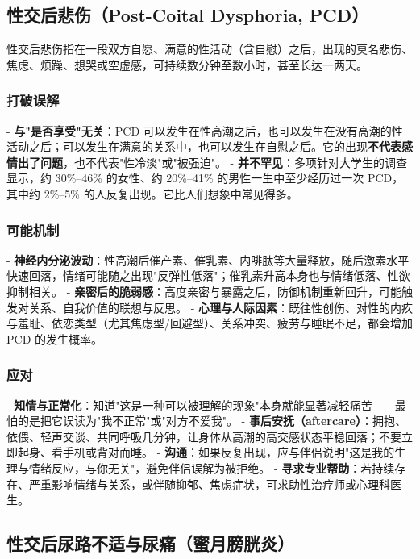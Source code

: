 \subsection{性交后悲伤（Post-Coital Dysphoria, PCD）}

性交后悲伤指在一段双方自愿、满意的性活动（含自慰）之后，出现的莫名悲伤、焦虑、烦躁、想哭或空虚感，可持续数分钟至数小时，甚至长达一两天。

\subsubsection{打破误解}

- \textbf{与"是否享受"无关}：PCD 可以发生在性高潮之后，也可以发生在没有高潮的性活动之后；可以发生在满意的关系中，也可以发生在自慰之后。它的出现\textbf{不代表感情出了问题}，也不代表"性冷淡"或"被强迫"。
- \textbf{并不罕见}：多项针对大学生的调查显示，约 30\%--46\% 的女性、约 20\%--41\% 的男性一生中至少经历过一次 PCD，其中约 2\%--5\% 的人反复出现。它比人们想象中常见得多。

\subsubsection{可能机制}

- \textbf{神经内分泌波动}：性高潮后催产素、催乳素、内啡肽等大量释放，随后激素水平快速回落，情绪可能随之出现"反弹性低落"；催乳素升高本身也与情绪低落、性欲抑制相关。
- \textbf{亲密后的脆弱感}：高度亲密与暴露之后，防御机制重新回升，可能触发对关系、自我价值的联想与反思。
- \textbf{心理与人际因素}：既往性创伤、对性的内疚与羞耻、依恋类型（尤其焦虑型/回避型）、关系冲突、疲劳与睡眠不足，都会增加 PCD 的发生概率。

\subsubsection{应对}

- \textbf{知情与正常化}：知道"这是一种可以被理解的现象"本身就能显著减轻痛苦——最怕的是把它误读为"我不正常"或"对方不爱我"。
- \textbf{事后安抚（aftercare）}：拥抱、依偎、轻声交谈、共同呼吸几分钟，让身体从高潮的高交感状态平稳回落；不要立即起身、看手机或背对而睡。
- \textbf{沟通}：如果反复出现，应与伴侣说明"这是我的生理与情绪反应，与你无关"，避免伴侣误解为被拒绝。
- \textbf{寻求专业帮助}：若持续存在、严重影响情绪与关系，或伴随抑郁、焦虑症状，可求助性治疗师或心理科医生。

\subsection{性交后尿路不适与尿痛（蜜月膀胱炎）}

